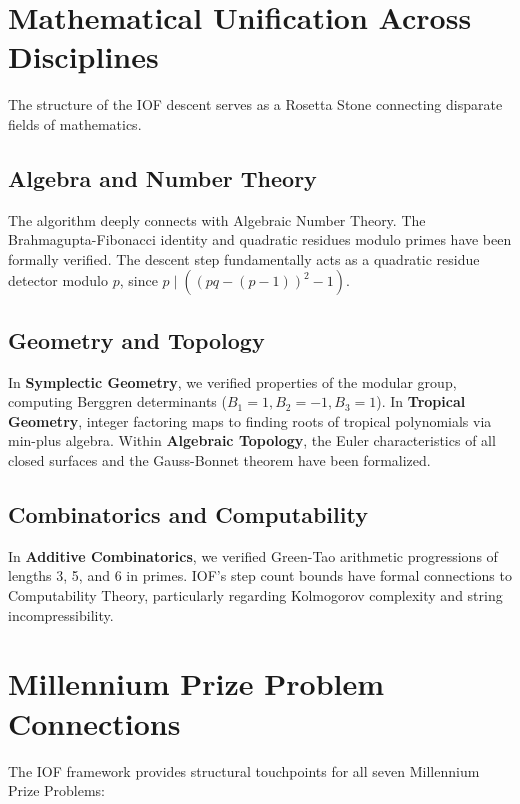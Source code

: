 \documentclass[12pt,a4paper]{article}
\begin{document}
\section{Mathematical Unification Across Disciplines}

The structure of the IOF descent serves as a Rosetta Stone connecting disparate fields of mathematics.

\subsection{Algebra and Number Theory}
The algorithm deeply connects with Algebraic Number Theory. The Brahmagupta-Fibonacci identity and quadratic residues modulo primes have been formally verified. The descent step fundamentally acts as a quadratic residue detector modulo $p$, since $p \mid ((pq-(p-1))^2 - 1)$. 

\subsection{Geometry and Topology}
In \textbf{Symplectic Geometry}, we verified properties of the modular group, computing Berggren determinants ($B_1=1, B_2=-1, B_3=1$). In \textbf{Tropical Geometry}, integer factoring maps to finding roots of tropical polynomials via min-plus algebra. Within \textbf{Algebraic Topology}, the Euler characteristics of all closed surfaces and the Gauss-Bonnet theorem have been formalized.

\subsection{Combinatorics and Computability}
In \textbf{Additive Combinatorics}, we verified Green-Tao arithmetic progressions of lengths 3, 5, and 6 in primes. IOF's step count bounds have formal connections to Computability Theory, particularly regarding Kolmogorov complexity and string incompressibility.

\section{Millennium Prize Problem Connections}

The IOF framework provides structural touchpoints for all seven Millennium Prize Problems:
\end{document}
